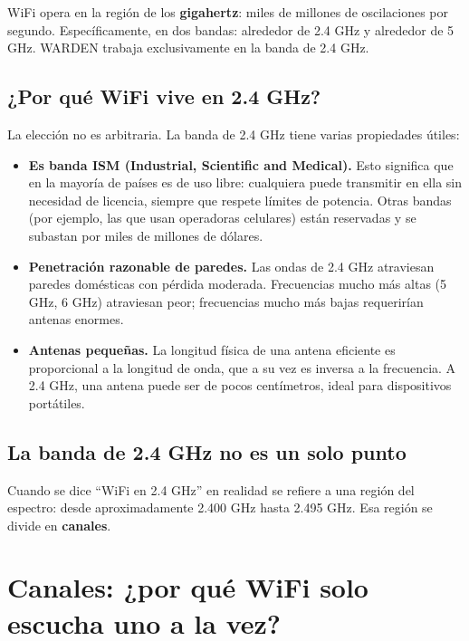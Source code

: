 \documentclass[11pt,a4paper]{article}
\begin{document}
WiFi opera en la región de los \textbf{gigahertz}: miles de millones de
oscilaciones por segundo. Específicamente, en dos bandas: alrededor de 2.4
GHz y alrededor de 5 GHz. WARDEN trabaja exclusivamente en la banda de 2.4
GHz.

\subsection{¿Por qué WiFi vive en 2.4 GHz?}
La elección no es arbitraria. La banda de 2.4 GHz tiene varias propiedades
útiles:

\begin{itemize}
  \item \textbf{Es banda ISM (Industrial, Scientific and Medical).} Esto
    significa que en la mayoría de países es de uso libre: cualquiera puede
    transmitir en ella sin necesidad de licencia, siempre que respete
    límites de potencia. Otras bandas (por ejemplo, las que usan operadoras
    celulares) están reservadas y se subastan por miles de millones de
    dólares.
  \item \textbf{Penetración razonable de paredes.} Las ondas de 2.4 GHz
    atraviesan paredes domésticas con pérdida moderada. Frecuencias mucho
    más altas (5 GHz, 6 GHz) atraviesan peor; frecuencias mucho más bajas
    requerirían antenas enormes.
  \item \textbf{Antenas pequeñas.} La longitud física de una antena
    eficiente es proporcional a la longitud de onda, que a su vez es
    inversa a la frecuencia. A 2.4 GHz, una antena puede ser de pocos
    centímetros, ideal para dispositivos portátiles.
\end{itemize}

\subsection{La banda de 2.4 GHz no es un solo punto}
Cuando se dice ``WiFi en 2.4 GHz'' en realidad se refiere a una región del
espectro: desde aproximadamente 2.400 GHz hasta 2.495 GHz. Esa región se
divide en \textbf{canales}.

\section{Canales: ¿por qué WiFi solo escucha uno a la vez?}
\end{document}
